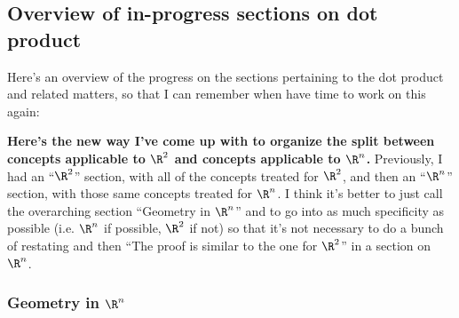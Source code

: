 \subsection*{Overview of in-progress sections on dot product}

Here's an overview of the progress on the sections pertaining to the dot product and related matters, so that I can remember when have time to work on this again:

\textbf{Here's the new way I've come up with to organize the split between concepts applicable to $\R^2$ and concepts applicable to $\R^n$.} Previously, I had an ``$\R^2$'' section, with all of the concepts treated for $\R^2$, and then an ``$\R^n$'' section, with those same concepts treated for $\R^n$. I think it's better to just call the overarching section ``Geometry in $\R^n$'' and to go into as much specificity as possible (i.e. $\R^n$ if possible, $\R^2$ if not) so that it's not necessary to do a bunch of restating and then ``The proof is similar to the one for $\R^2$'' in a section on $\R^n$.

\subsubsection*{Geometry in $\R^n$}

